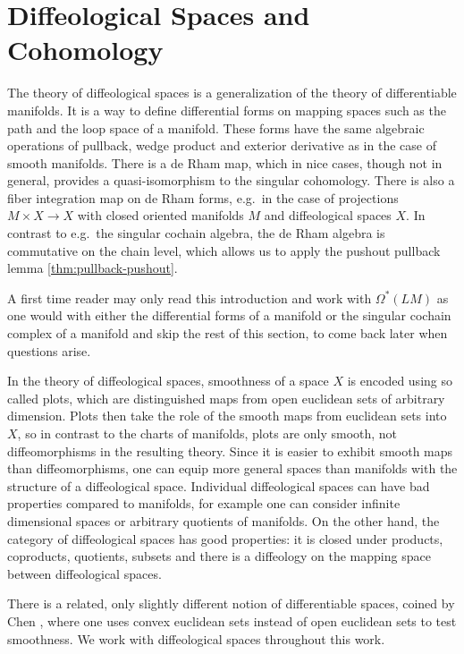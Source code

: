 \documentclass{scrartcl}
\theoremstyle{plain}
\theoremstyle{definition}
\begin{document}
\section{Diffeological Spaces and Cohomology}\label{sec:diffeological}

The theory of diffeological spaces is a generalization of the theory of differentiable manifolds. It is a way to define differential forms on mapping spaces such as the path and the loop space of a manifold. These forms have the same algebraic operations of pullback, wedge product and exterior derivative as in the case of smooth manifolds. There is a de Rham map, which in nice cases, though not in general, provides a quasi-isomorphism to the singular cohomology. There is also a fiber integration map on de Rham forms, e.g.\ in the case of projections $M\times X\to X$ with closed oriented manifolds $M$ and diffeological spaces $X$. In contrast to e.g.\ the singular cochain algebra, the de Rham algebra is commutative on the chain level, which allows us to apply the pushout pullback lemma \ref{thm:pullback-pushout}. 

A first time reader may only read this introduction and work with $\Omega^*(LM)$ as one would with either the differential forms of a manifold or the singular cochain complex of a manifold and skip the rest of this section, to come back later when questions arise. 

In the theory of diffeological spaces, smoothness of a space $X$ is encoded using so called plots, which are distinguished maps from open euclidean sets of arbitrary dimension. Plots then take the role of the smooth maps from euclidean sets into $X$, so in contrast to the charts of manifolds, plots are only smooth, not diffeomorphisms in the resulting theory. Since it is easier to exhibit smooth maps than diffeomorphisms, one can equip more general spaces than manifolds with the structure of a diffeological space. Individual diffeological spaces can have bad properties compared to manifolds, for example one can consider infinite dimensional spaces or arbitrary quotients of manifolds. On the other hand, the category of diffeological spaces has good properties: it is closed under products, coproducts, quotients, subsets and there is a diffeology on the mapping space between diffeological spaces. 

There is a related, only slightly different notion of differentiable spaces, coined by Chen \cite{chen1973iterated}, where one uses convex euclidean sets instead of open euclidean sets to test smoothness. We work with diffeological spaces throughout this work. 
\end{document}

